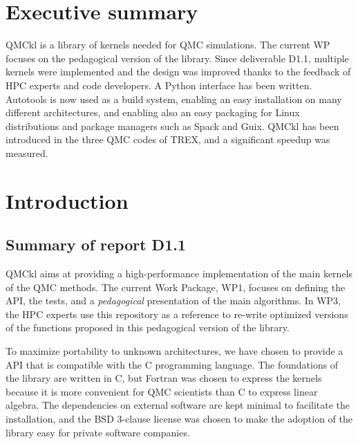 \newcommand{\orgmode}{\texttt{org-mode}}
\newcommand{\Makefile}{\texttt{Makefile}}
\newcommand{\context}{\texttt{context}}
\newcommand{\CC}{C\nolinebreak\hspace{-.05em}\raisebox{.4ex}{\tiny\bf +}\nolinebreak\hspace{-.10em}\raisebox{.4ex}{\tiny\bf +}}
\def\CC{{C\nolinebreak[4]\hspace{-.05em}\raisebox{.4ex}{\tiny\bf ++}}}

\section{Executive summary}

QMCkl is a library of kernels needed for \ac{QMC} simulations. The current \ac{WP}
focuses on the pedagogical version of the library. Since deliverable D1.1, multiple kernels
were implemented and the design was improved thanks to the feedback of HPC experts and code
developers. A Python interface has been written. Autotools is now used as a build system,
enabling an easy installation on many different architectures, and enabling also an easy
packaging for Linux distributions and package managers such as Spack and Guix.
QMCkl has been introduced in the three \ac{QMC} codes of TREX, and a significant speedup
was measured.


\section{Introduction}

\subsection{Summary of report D1.1}

\Ac{QMCkl} aims at providing a high-performance
implementation of the main kernels of the \ac{QMC} methods.
The current Work Package, WP1, focuses on defining the \ac{API}, the tests,
and a \emph{pedagogical} presentation of the main algorithms.
In WP3, the \ac{HPC} experts use this repository as a reference to re-write
optimized versions of the functions proposed in this pedagogical version of the library.

To maximize portability to unknown architectures, we have chosen to provide a \ac{API} that
is compatible with the C programming language. The foundations of the library are written in C, but Fortran
was chosen to express the kernels because it is more convenient for \ac{QMC} scientists than C to express linear algebra.
The dependencies on external software are kept minimal to facilitate the installation, and the
BSD 3-clause license was chosen to make the adoption of the library easy for private software companies.

